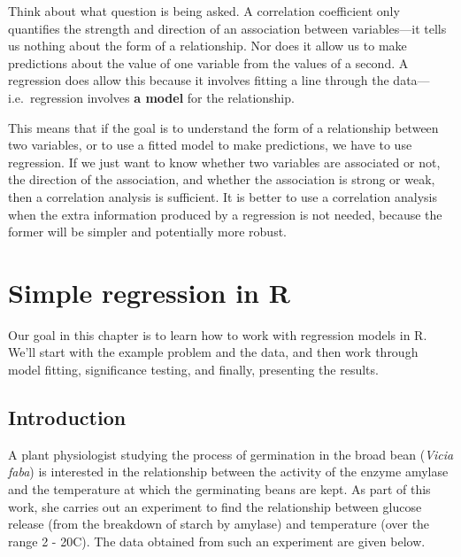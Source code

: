 \documentclass[
]{book}
\begin{document}
Think about what question is being asked. A correlation coefficient only quantifies the strength and direction of an association between variables---it tells us nothing about the form of a relationship. Nor does it allow us to make predictions about the value of one variable from the values of a second. A regression does allow this because it involves fitting a line through the data---i.e.~regression involves \textbf{a model} for the relationship.

This means that if the goal is to understand the form of a relationship between two variables, or to use a fitted model to make predictions, we have to use regression. If we just want to know whether two variables are associated or not, the direction of the association, and whether the association is strong or weak, then a correlation analysis is sufficient. It is better to use a correlation analysis when the extra information produced by a regression is not needed, because the former will be simpler and potentially more robust.

\hypertarget{regression-in-R}{%
\chapter{Simple regression in R}\label{regression-in-R}}

Our goal in this chapter is to learn how to work with regression models in R. We'll start with the example problem and the data, and then work through model fitting, significance testing, and finally, presenting the results.

\hypertarget{introduction-2}{%
\section{Introduction}\label{introduction-2}}

A plant physiologist studying the process of germination in the broad bean (\emph{Vicia faba}) is interested in the relationship between the activity of the enzyme amylase and the temperature at which the germinating beans are kept. As part of this work, she carries out an experiment to find the relationship between glucose release (from the breakdown of starch by amylase) and temperature (over the range 2 - 20C). The data obtained from such an experiment are given below.
\end{document}
